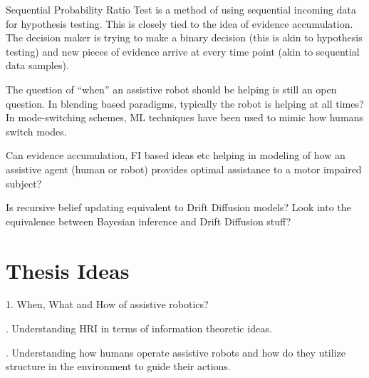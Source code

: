 \documentclass[]{article}
\begin{document}
Sequential Probability Ratio Test is a method of using sequential incoming data for hypothesis testing. This is closely tied to the idea of evidence accumulation. The decision maker is trying to make a binary decision (this is akin to hypothesis testing) and new pieces of evidence arrive at every time point (akin to sequential data samples). 

The question of ``when'' an assistive robot should be helping is still an open question. In blending based paradigms, typically the robot is helping at all times? In mode-switching schemes, ML techniques have been used to mimic how humans switch modes. 

Can evidence accumulation, FI based ideas etc helping in modeling of how an assistive agent (human or robot) provides optimal assistance to a motor impaired subject? 

Is recursive belief updating equivalent to Drift Diffusion models? Look into the equivalence between Bayesian inference and Drift Diffusion stuff? 

\section*{Thesis Ideas}

1. When, What and How of assistive robotics? 

. Understanding HRI in terms of information theoretic ideas. 

. Understanding how humans operate assistive robots and how do they utilize structure in the environment to guide their actions. 
\end{document}
